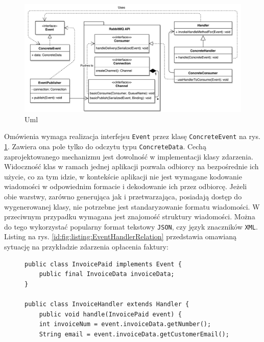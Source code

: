 \documentclass[a4paper]{book}
\begin{document}
{\begin{figure}
	\centering
	\includegraphics[width=1.0\textwidth]{./img/EDA_Rabbit_UML.pdf}
	\caption{Uml}
	\label{id:fig:6}
\end{figure}
Omówienia wymaga realizacja interfejsu \lstinline|Event| przez klasę \lstinline|ConcreteEvent| na rys. \ref{id:fig:6}. Zawiera ona pole tylko do odczytu typu \lstinline|ConcreteData|. Cechą zaprojektowanego mechanizmu jest dowolność w implementacji klasy zdarzenia. Widoczność klas w ramach jednej aplikacji pozwala odbiorcy na bezpośrednie ich użycie, co za tym idzie, w kontekście aplikacji nie jest wymagane kodowanie wiadomości w odpowiednim formacie i dekodowanie ich przez odbiorcę. Jeżeli obie warstwy, zarówno generująca jak i przetwarzająca, posiadają dostęp do wygenerowanej klasy, nie potrzebne jest standaryzowanie formatu wiadomości. W przeciwnym przypadku wymagana jest znajomość struktury wiadomości. Można do tego wykorzystać popularny format tekstowy \lstinline|JSON|, czy język znaczników \lstinline|XML|. Listing na rys. \ref{id:fig:listing:EventHandlerRelation} przedstawia omawianą sytuację na przykładzie zdarzenia opłacenia faktury:

\begin{figure}
	\begin{lstlisting}
public class InvoicePaid implements Event {
	public final InvoiceData invoiceData;
}

public class InvoiceHandler extends Handler {
	public void handle(InvoicePaid event) {
	int invoiceNum = event.invoiceData.getNumber();
	String email = event.invoiceData.getCustomerEmail();


\end{lstlisting}
\end{figure}}
\end{document}
